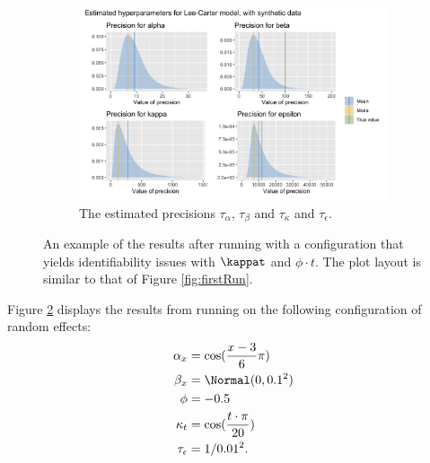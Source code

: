 \begin{figure}[h!]
    \begin{subfigure}[b]{0.6\textwidth}
        \includegraphics[width=\textwidth]{synthetic-data/Figures/hyperparameters-LC-synthetic-2-2.png}
        \caption{The estimated precisions $\tau_\alpha$, $\tau_\beta$ and $\tau_\kappa$ and $\tau_\epsilon$.}
        \label{fig:unidentifiabilityKappa-bottom}
    \end{subfigure}
    
    \caption{An example of the results after running \inlabru with a configuration that yields identifiability issues with $\kappat$ and $\phi \cdot t$. The plot layout is similar to that of Figure \ref{fig:firstRun}.}
    \label{fig:unidentifiabilityKappa}
\end{figure}
Figure \ref{fig:unidentifiabilityKappa} displays the results from running \inlabru on the following configuration of random effects:
\begin{equation}
    \begin{aligned}
    \alpha_x &= \cos(\frac{x-3}{6}\pi)\\
    \beta_x &= \Normal(0,0.1^2)\\
    \phi &= -0.5\\
    \kappa_t &= \cos(\frac{t\cdot \pi}{20})\\
    \tau_{\epsilon} &= 1/0.01^2.
    \end{aligned}
\end{equation}
